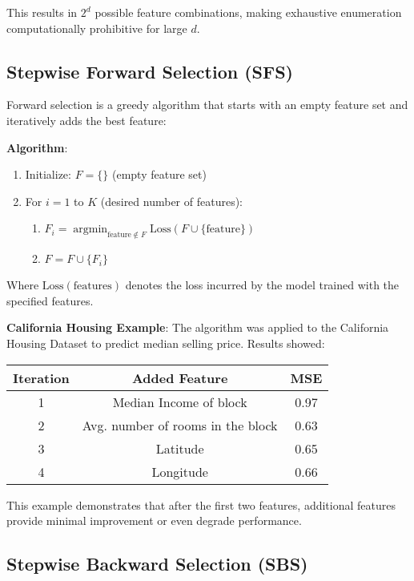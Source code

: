 \documentclass{article}
\DeclareMathOperator*{\argminF}{argmin}
\begin{document}
This results in $2^d$ possible feature combinations, making exhaustive enumeration computationally prohibitive for large $d$.

\subsection{Stepwise Forward Selection (SFS)}

Forward selection is a greedy algorithm that starts with an empty feature set and iteratively adds the best feature:

\textbf{Algorithm}:
\begin{enumerate}
    \item Initialize: $F = \{\}$ (empty feature set)
    \item For $i = 1$ to $K$ (desired number of features):
    \begin{enumerate}
        \item $F_i = \argminF_{\text{feature} \notin F} \text{Loss}(F \cup \{\text{feature}\})$
        \item $F = F \cup \{F_i\}$
    \end{enumerate}
\end{enumerate}

Where $\text{Loss}(\text{features})$ denotes the loss incurred by the model trained with the specified features.

\textbf{California Housing Example}:
The algorithm was applied to the California Housing Dataset to predict median selling price. Results showed:

\begin{center}
\begin{tabular}{|c|c|c|}
\hline
\textbf{Iteration} & \textbf{Added Feature} & \textbf{MSE} \\
\hline
1 & Median Income of block & 0.97 \\
2 & Avg. number of rooms in the block & 0.63 \\
3 & Latitude & 0.65 \\
4 & Longitude & 0.66 \\
\hline
\end{tabular}
\end{center}

This example demonstrates that after the first two features, additional features provide minimal improvement or even degrade performance.

\subsection{Stepwise Backward Selection (SBS)}
\end{document}
